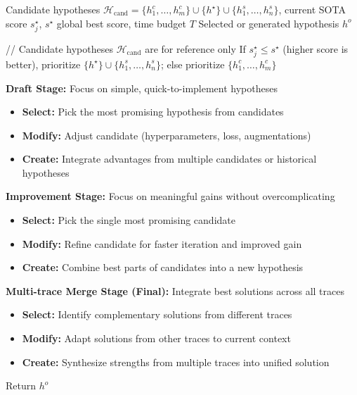 \begin{algorithm}[htbp]
\caption{LLM-Based Hypothesis Selection}
\label{alg:llm_hypothesis_select_flat}
\begin{algorithmic}
\Require Candidate hypotheses $\mathcal{H}_{\text{cand}} = \{h_1^c, \dots, h^c_m\} \cup \{h^\star\} \cup \{h_1^s, \dots, h^s_n\}$, current SOTA score $s^{\star}_{j}$, $s^{\star}$ global best score, time budget $T$
\Ensure Selected or generated hypothesis $h^o$

\State // Candidate hypotheses $\mathcal{H}_{\text{cand}}$ are for reference only
\State If $s^{\star}_{j} \leq s^{\star}$ (higher score is better), prioritize $\{h^\star\} \cup \{h_1^s, \dots, h^s_n\}$; else prioritize $\{h_1^c, \dots, h^c_m\}$

\State \textbf{Draft Stage:} Focus on simple, quick-to-implement hypotheses
\begin{itemize}
    \item \textbf{Select:} Pick the most promising hypothesis from candidates
    \item \textbf{Modify:} Adjust candidate (hyperparameters, loss, augmentations)
    \item \textbf{Create:} Integrate advantages from multiple candidates or historical hypotheses
\end{itemize}

\State \textbf{Improvement Stage:} Focus on meaningful gains without overcomplicating
\begin{itemize}
    \item \textbf{Select:} Pick the single most promising candidate
    \item \textbf{Modify:} Refine candidate for faster iteration and improved gain
    \item \textbf{Create:} Combine best parts of candidates into a new hypothesis
\end{itemize}

\State \textbf{Multi-trace Merge Stage (Final):} Integrate best solutions across all traces
\begin{itemize}
    \item \textbf{Select:} Identify complementary solutions from different traces
    \item \textbf{Modify:} Adapt solutions from other traces to current context
    \item \textbf{Create:} Synthesize strengths from multiple traces into unified solution
\end{itemize}
\State Return $h^o$
\end{algorithmic}
\end{algorithm}


